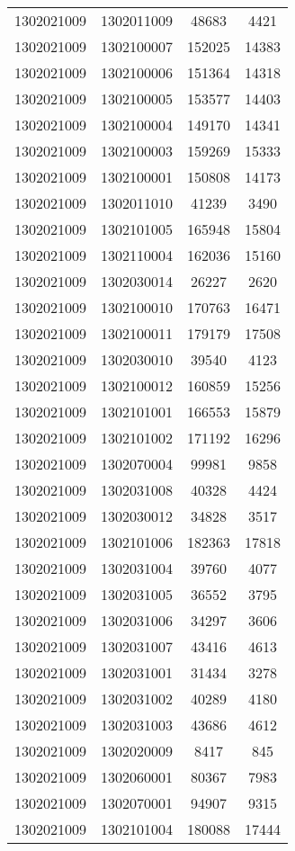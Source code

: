 \begin{longtable}[h]{llcc}
		1302021009 & 1302011009 & 48683 & 4421\\
		1302021009 & 1302100007 & 152025 & 14383\\
		1302021009 & 1302100006 & 151364 & 14318\\
		1302021009 & 1302100005 & 153577 & 14403\\
		1302021009 & 1302100004 & 149170 & 14341\\
		1302021009 & 1302100003 & 159269 & 15333\\
		1302021009 & 1302100001 & 150808 & 14173\\
		1302021009 & 1302011010 & 41239 & 3490\\
		1302021009 & 1302101005 & 165948 & 15804\\
		1302021009 & 1302110004 & 162036 & 15160\\
		1302021009 & 1302030014 & 26227 & 2620\\
		1302021009 & 1302100010 & 170763 & 16471\\
		1302021009 & 1302100011 & 179179 & 17508\\
		1302021009 & 1302030010 & 39540 & 4123\\
		1302021009 & 1302100012 & 160859 & 15256\\
		1302021009 & 1302101001 & 166553 & 15879\\
		1302021009 & 1302101002 & 171192 & 16296\\
		1302021009 & 1302070004 & 99981 & 9858\\
		1302021009 & 1302031008 & 40328 & 4424\\
		1302021009 & 1302030012 & 34828 & 3517\\
		1302021009 & 1302101006 & 182363 & 17818\\
		1302021009 & 1302031004 & 39760 & 4077\\
		1302021009 & 1302031005 & 36552 & 3795\\
		1302021009 & 1302031006 & 34297 & 3606\\
		1302021009 & 1302031007 & 43416 & 4613\\
		1302021009 & 1302031001 & 31434 & 3278\\
		1302021009 & 1302031002 & 40289 & 4180\\
		1302021009 & 1302031003 & 43686 & 4612\\
		1302021009 & 1302020009 & 8417 & 845\\
		1302021009 & 1302060001 & 80367 & 7983\\
		1302021009 & 1302070001 & 94907 & 9315\\
		1302021009 & 1302101004 & 180088 & 17444\\

\end{longtable}
